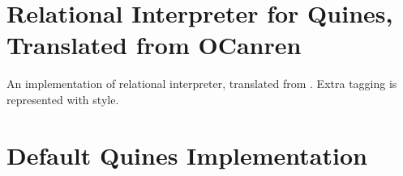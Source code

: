 \appendix
\section{Relational Interpreter for Quines, Translated from OCanren}
\label{appendix:synQuines}

An implementation of relational interpreter, translated from \OCanren{}. Extra tagging is represented with \textbf{} style.



\section{Default Quines Implementation}
\label{appendix:defaultQuines}

